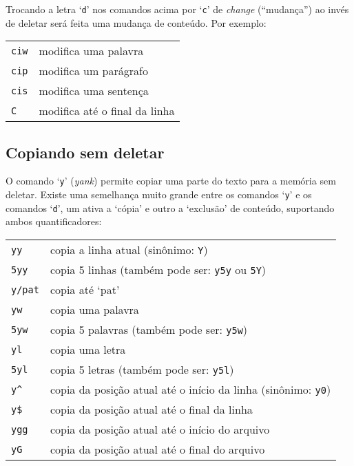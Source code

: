 Trocando a letra `{\tt d}' nos comandos acima por `{\tt c}' de {\em change}
(``mudança'') ao invés de deletar será feita uma mudança de conteúdo.  Por
exemplo:
\begin{table}[htb]\begin{center} \begin{tabular}{ll} \hline
     \verb|ciw| & modifica uma palavra \\
     \verb|cip| & modifica um parágrafo\\
     \verb|cis| & modifica uma sentença\\
     \verb|C| &  modifica até o final da linha\\
\hline \end{tabular}\end{center}\end{table}

\subsection{Copiando sem deletar}\label{Copiando sem deletar}

O comando `{\tt y}' ({\em yank}) permite copiar uma parte do 
texto para a memória sem deletar.  Existe uma semelhança muito grande entre 
os comandos `{\tt y}' e os comandos `{\tt d}', um ativa a `cópia' e outro a 
`exclusão' de conteúdo, suportando ambos quantificadores:

\begin{table}[htb]\begin{center} \begin{tabular}{ll} \hline
     \verb|yy|   & copia a linha atual (sinônimo: \verb|Y|)\\
     \verb|5yy| &  copia 5 linhas (também pode ser: \verb|y5y| ou \verb|5Y|)\\
     \verb|y/pat| &  copia até `pat'\\
     \verb|yw|  & copia uma palavra\\
     \verb|5yw| & copia 5 palavras (também pode ser: \verb|y5w|)\\
     \verb|yl|  & copia uma letra\\
     \verb|5yl| & copia 5 letras (também pode ser: \verb|y5l|)\\
     \verb|y^| & copia da posição atual até o início da linha (sinônimo: \verb|y0|)\\
     \verb|y$| & copia da posição atual até o final da linha\\
     \verb|ygg| & copia da posição atual até o início do arquivo\\
     \verb|yG| & copia da posição atual até o final do arquivo\\
\hline \end{tabular}\end{center}\end{table}

